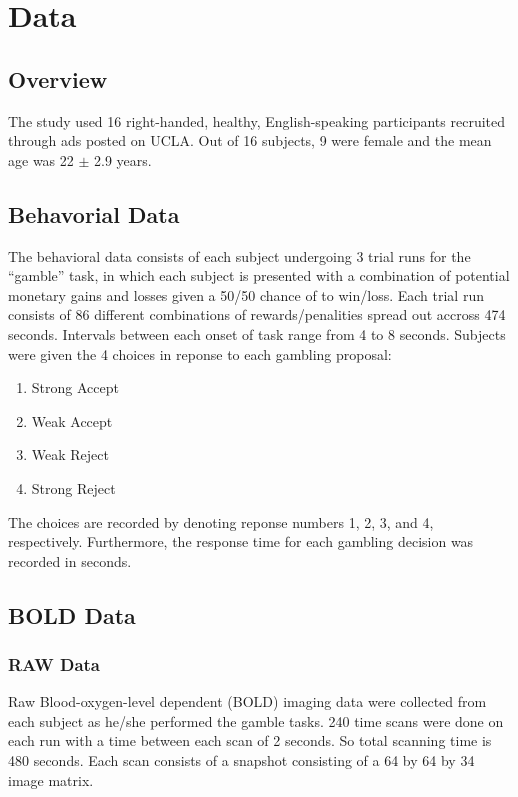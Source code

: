 \section{Data}
\subsection{Overview}
The study used 16 right-handed, healthy, English-speaking participants 
recruited through ads posted on UCLA. Out of 16 subjects, 9 were female and 
the mean age was 22 $ \pm $ 2.9 years. \cite{Tom2007LossAversion}

\subsection{Behavorial Data}
The behavioral data consists of each subject undergoing 3 trial runs for the 
``gamble'' task, in which each subject is presented with a combination of 
potential monetary gains and losses given a 50/50 chance of to win/loss. Each 
trial run consists of 86 different combinations of rewards/penalities spread 
out accross 474 seconds. Intervals between each onset of task range from 4 to 
8 seconds. Subjects were given the 4 choices in reponse to each gambling 
proposal:
\begin{enumerate}
  \item Strong Accept
  \item Weak Accept
  \item Weak Reject
  \item Strong Reject
\end{enumerate}
The choices are recorded by denoting reponse numbers 1, 2, 3, and 4, 
respectively. Furthermore, the response time for each gambling decision was 
recorded in seconds. 
\subsection{BOLD Data}
\subsubsection{RAW Data}
Raw Blood-oxygen-level dependent (BOLD) imaging data were collected from each
subject as he/she performed the gamble tasks. 240 time scans were done on each
run with a time between each scan of 2 seconds. So total scanning time is 480
seconds. Each scan consists of a snapshot consisting of a 64 by 64 by 34 image
matrix.


